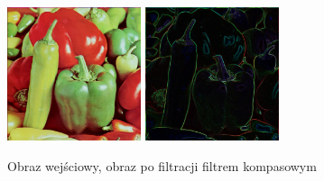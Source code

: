 \documentclass[final,a4paper,openany,12pt]{mwbk}
\begin{document}
\begin{figure}[H]
	\begin{center}
		\includegraphics[width=0.35\textwidth]{peppers_color}
		\includegraphics[width=0.35\textwidth]{peppers_color_compassSobol_result}
	\end{center}
	\caption{Obraz wejściowy, obraz po filtracji filtrem kompasowym}
\end{figure}


\end{document}
